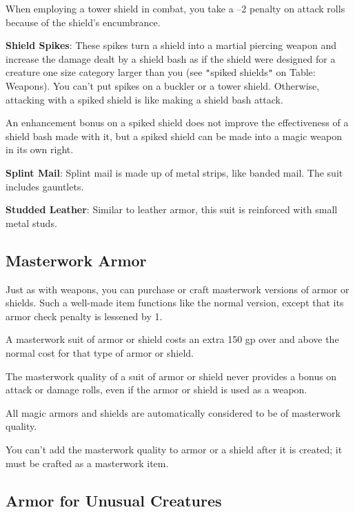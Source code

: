 When employing a tower shield in combat, you take a --2 penalty on attack rolls because of the shield's encumbrance.
		
\textbf{Shield Spikes}: These spikes turn a shield into a martial piercing weapon and increase the damage dealt by a shield bash as if the shield were designed for a creature one size category larger than you (see \texttt{{}"{}}spiked shields\texttt{{}"{}} on Table: Weapons). You can't put spikes on a buckler or a tower shield. Otherwise, attacking with a spiked shield is like making a shield bash attack.
		
An enhancement bonus on a spiked shield does not improve the effectiveness of a shield bash made with it, but a spiked shield can be made into a magic weapon in its own right.
		
\textbf{Splint Mail}: Splint mail is made up of metal strips, like banded mail. The suit includes gauntlets.
		
\textbf{Studded Leather}: Similar to leather armor, this suit is reinforced with small metal studs.
	
\subsection{Masterwork Armor}

		
Just as with weapons, you can purchase or craft masterwork versions of armor or shields. Such a well-made item functions like the normal version, except that its armor check penalty is lessened by 1. 
		
A masterwork suit of armor or shield costs an extra 150 gp over and above the normal cost for that type of armor or shield.
		
The masterwork quality of a suit of armor or shield never provides a bonus on attack or damage rolls, even if the armor or shield is used as a weapon.
		
All magic armors and shields are automatically considered to be of masterwork quality.
		
You can't add the masterwork quality to armor or a shield after it is created; it must be crafted as a masterwork item.
	
\subsection{Armor for Unusual Creatures}

